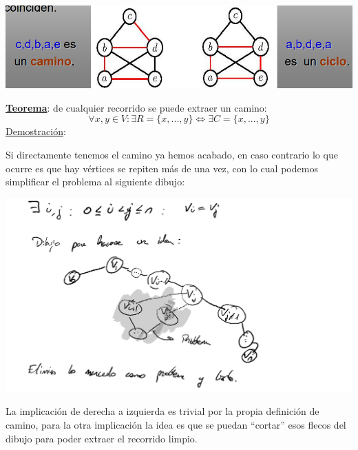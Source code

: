 \documentclass[10pt,a4paper,openright]{book}
\begin{document}
\begin{center}
\includegraphics[scale=0.65]{camino y ciclo}
\end{center}

\underline{\textbf{Teorema}}: de cualquier recorrido se puede extraer un camino:
$$\forall x,y\in V: \exists R=\{x, ..., y\}\Leftrightarrow \exists C=\{x,..., y\}$$
\underline{Demostración}:

Si directamente tenemos el camino ya hemos acabado, en caso contrario lo que ocurre es que hay vértices se repiten más de una vez, con lo cual podemos simplificar el problema al siguiente dibujo:
\begin{center}
\includegraphics[scale=0.65]{teorema camino}
\end{center}
La implicación de derecha a izquierda es trivial por la propia definición de camino, para la otra implicación la idea es que se puedan ``cortar'' esos flecos del dibujo para poder extraer el recorrido limpio.
\end{document}
